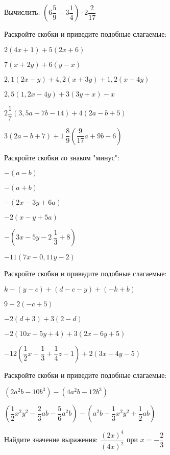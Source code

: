 %
%
%
%
\begin{class}[number=1]
	\begin{listofex}
		\item Вычислить: \( \left( 6\dfrac{5}{9}-3\dfrac{1}{4} \right)\cdot2\dfrac{2}{17} \)
		\item Раскройте скобки и приведите подобные слагаемые:
		\begin{enumcols}[itemcolumns=2]
			\item \( 2(4x+1)+5(2x+6) \)
			\item \( 7(x+2y)+6(y-x) \)
			\item \( 2,1(2x-y)+4,2(x+3y)+1,2(x-4y) \)
			\item \( 2,5(1,2x-4y)+3(3y+x)-x\)
			\item \( 2\dfrac{1}{7}(3,5a+7b-14)+4(2a-b+5) \)
			\item \( 3(2a-b+7)+1\:\dfrac{8}{9}\left( \dfrac{9}{17}a+9b-6 \right) \)
		\end{enumcols}
		\item Раскройте скобки cо знаком "минус":
		\begin{enumcols}[itemcolumns=3]
			\item \( -(a-b) \)
			\item \( -(a+b) \)
			\item \( -(2x-3y+6a) \)
			\item \( -2(x-y+5a) \)
			\item \( -\left( 3x-5y-2\:\dfrac{1}{3}+8 \right) \)
			\item \( -11(7x-0,11y-2) \)
		\end{enumcols}
		\item Раскройте скобки и приведите подобные слагаемые:
		\begin{enumcols}[itemcolumns=2]
			\item \( k-(y-c)+(d-c-y)+(-k+b) \)
			\item \( 9-2(-c+5) \)
			\item \( -2(d+3)+3(2-d) \)
			\item \( -2(10x-5y+4)+3(2x-6y+5) \)
			\item \( -12\left( \dfrac{1}{2}x-\dfrac{1}{3}+\dfrac{1}{4}z-1 \right)+2(3x-4y-5) \)
		\end{enumcols}
		\item Раскройте скобки и приведите подобные слагаемые:
		\begin{enumcols}[itemcolumns=2]
			\item \( (2a^2b-10b^3)-(4a^2b-12b^3) \)
			\item \( \left( \dfrac{1}{2}x^2y^2-\dfrac{2}{3}ab-\dfrac{5}{6}a^2b \right)-\left( a^2b-\dfrac{1}{3}x^2y^2+\dfrac{1}{2}ab \right) \)
		\end{enumcols}
		\item Найдите значение выражения: \( \dfrac{(2x)^4}{(4x)^2} \) при \( x=-\dfrac{2}{3} \)
	\end{listofex}
\end{class}
